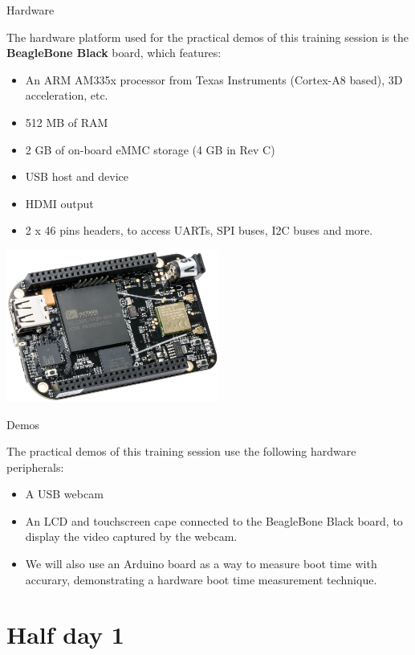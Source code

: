 \documentclass[a4paper,12pt,obeyspaces,spaces,hyphens]{article}
\begin{document}
\feagendatwocolumn
{Hardware}
{
  The hardware platform used for the practical demos of this training
  session is the {\bf BeagleBone Black} board, which features:

  \begin{itemize}
  \item An ARM AM335x processor from Texas Instruments (Cortex-A8
    based), 3D acceleration, etc.
  \item 512 MB of RAM
  \item 2 GB of on-board eMMC storage
        \newline(4 GB in Rev C)
  \item USB host and device
  \item HDMI output
  \item 2 x 46 pins headers, to access UARTs, SPI buses, I2C buses
    and more.
  \end{itemize}
}
{}
{
  \begin{center}
    \includegraphics[height=5cm]{../slides/beagleboneblack-board/beagleboneblack.png}
  \end{center}
}

\feagendaonecolumn
{Demos}
{
  The practical demos of this training session use the following
  hardware peripherals:

  \begin{itemize}
  \item A USB webcam
  \item An LCD and touchscreen cape connected to the
    BeagleBone Black board, to display the video captured by the webcam.
  \item We will also use an Arduino board as a way to measure boot time with accurary,
    demonstrating a hardware boot time measurement technique.
  \end{itemize}
}

\section{Half day 1}
\end{document}
